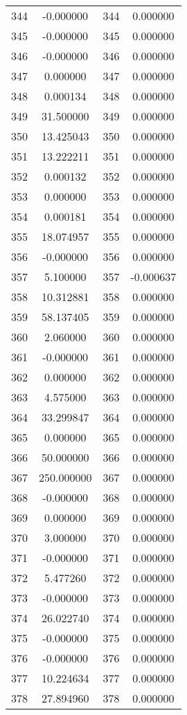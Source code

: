 \documentclass[12pt]{article}
\begin{document}
\begin{longtable}{@{}cccc@{}}
344 & -0.000000 & 344 & 0.000000 \\
345 & -0.000000 & 345 & 0.000000 \\
346 & -0.000000 & 346 & 0.000000 \\
347 & 0.000000 & 347 & 0.000000 \\
348 & 0.000134 & 348 & 0.000000 \\
349 & 31.500000 & 349 & 0.000000 \\
350 & 13.425043 & 350 & 0.000000 \\
351 & 13.222211 & 351 & 0.000000 \\
352 & 0.000132 & 352 & 0.000000 \\
353 & 0.000000 & 353 & 0.000000 \\
354 & 0.000181 & 354 & 0.000000 \\
355 & 18.074957 & 355 & 0.000000 \\
356 & -0.000000 & 356 & 0.000000 \\
357 & 5.100000 & 357 & -0.000637 \\
358 & 10.312881 & 358 & 0.000000 \\
359 & 58.137405 & 359 & 0.000000 \\
360 & 2.060000 & 360 & 0.000000 \\
361 & -0.000000 & 361 & 0.000000 \\
362 & 0.000000 & 362 & 0.000000 \\
363 & 4.575000 & 363 & 0.000000 \\
364 & 33.299847 & 364 & 0.000000 \\
365 & 0.000000 & 365 & 0.000000 \\
366 & 50.000000 & 366 & 0.000000 \\
367 & 250.000000 & 367 & 0.000000 \\
368 & -0.000000 & 368 & 0.000000 \\
369 & 0.000000 & 369 & 0.000000 \\
370 & 3.000000 & 370 & 0.000000 \\
371 & -0.000000 & 371 & 0.000000 \\
372 & 5.477260 & 372 & 0.000000 \\
373 & -0.000000 & 373 & 0.000000 \\
374 & 26.022740 & 374 & 0.000000 \\
375 & -0.000000 & 375 & 0.000000 \\
376 & -0.000000 & 376 & 0.000000 \\
377 & 10.224634 & 377 & 0.000000 \\
378 & 27.894960 & 378 & 0.000000 \\

\end{longtable}
\end{document}
